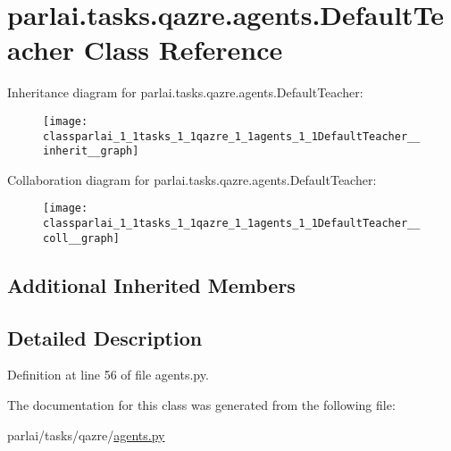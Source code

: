 \hypertarget{classparlai_1_1tasks_1_1qazre_1_1agents_1_1DefaultTeacher}{}\section{parlai.\+tasks.\+qazre.\+agents.\+Default\+Teacher Class Reference}
\label{classparlai_1_1tasks_1_1qazre_1_1agents_1_1DefaultTeacher}


Inheritance diagram for parlai.\+tasks.\+qazre.\+agents.\+Default\+Teacher\+:
\nopagebreak
\begin{figure}[H]
\begin{center}
\leavevmode
\texttt{[image: classparlai\_1\_1tasks\_1\_1qazre\_1\_1agents\_1\_1DefaultTeacher\_\_inherit\_\_graph]}
\end{center}
\end{figure}


Collaboration diagram for parlai.\+tasks.\+qazre.\+agents.\+Default\+Teacher\+:
\nopagebreak
\begin{figure}[H]
\begin{center}
\leavevmode
\texttt{[image: classparlai\_1\_1tasks\_1\_1qazre\_1\_1agents\_1\_1DefaultTeacher\_\_coll\_\_graph]}
\end{center}
\end{figure}
\subsection*{Additional Inherited Members}


\subsection{Detailed Description}


Definition at line 56 of file agents.\+py.



The documentation for this class was generated from the following file\+:\begin{DoxyCompactItemize}
\item 
parlai/tasks/qazre/\hyperlink{parlai_2tasks_2qazre_2agents_8py}{agents.\+py}\end{DoxyCompactItemize}
